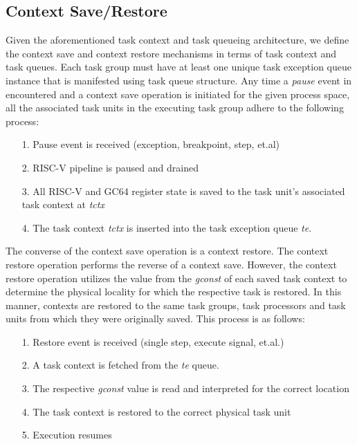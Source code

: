 \documentclass{article}
\begin{document}
\subsection{Context Save/Restore}

Given the aforementioned task context and task queueing architecture, we define the context save and context restore mechanisms in terms of task context and task queues.  Each task group must have at least one unique task exception queue instance that is manifested using task queue structure.  Any time a \emph{pause} event in encountered and a context save operation is initiated for the given process space, all the associated task units in the executing task group adhere to the following process: 

\begin{enumerate}
\item[1.] Pause event is received (exception, breakpoint, step, et.al)
\item[2.] RISC-V pipeline is paused and drained
\item[3.] All RISC-V and GC64 register state is saved to the task unit's associated task context at \emph{tctx}
\item[4.] The task context \emph{tctx} is inserted into the task exception queue \emph{te}.  
\end{enumerate}

The converse of the context save operation is a context restore.  The context restore operation performs the reverse of a context save.  However, the context restore operation utilizes the value from the \emph{gconst} of each saved task context to determine the physical locality for which the respective task is restored.  In this manner, contexts are restored to the same task groups, task processors and task units from which they were originally saved.  This process is as follows: 

\begin{enumerate}
\item[1.] Restore event is received (single step, execute signal, et.al.)
\item[2.] A task context is fetched from the \emph{te} queue.  
\item[3.] The respective \emph{gconst} value is read and interpreted for the correct location 
\item[4.] The task context is restored to the correct physical task unit
\item[5.] Execution resumes
\end{enumerate}
\end{document}
